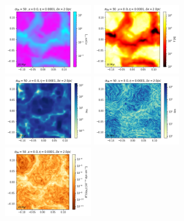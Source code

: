 \documentclass[preprint2]{aastex63}
\begin{document}

\begin{figure}
\centering
\includegraphics[trim=0.0cm 0.00cm 0.0cm 0.0cm,clip=true,width=0.33\textwidth]{csc_figs/rho2pcPm0e-4_00.png}
\includegraphics[trim=0.0cm 0.00cm 0.0cm 0.0cm,clip=true,width=0.33\textwidth]{csc_figs/tt2pcPm0e-4_00.png}
\includegraphics[trim=0.0cm 0.00cm 0.0cm 0.0cm,clip=true,width=0.33\textwidth]{csc_figs/Pm2pcPm0e-4_00.png}
\includegraphics[trim=0.0cm 0.00cm 0.0cm 0.0cm,clip=true,width=0.33\textwidth]{csc_figs/Rm2pcPm0e-4_00.png}
\includegraphics[trim=0.0cm 0.00cm 0.0cm 0.0cm,clip=true,width=0.33\textwidth]{csc_figs/pb2pcPm0e-4_00.png}

\end{figure}
\end{document}

